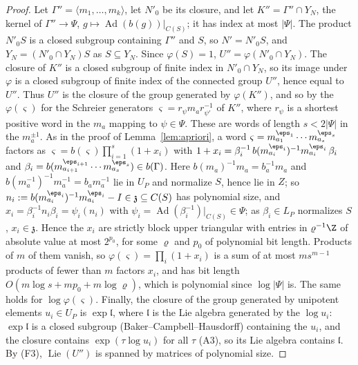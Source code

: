 \begin{proof}
Let $\Gamma''=\langle m_1,\ldots,m_k\rangle$, let $N'_0$ be its closure, and let $K''=\Gamma''\cap Y_N$, the kernel of
$\Gamma''\to\Psi$, $g\mapsto\operatorname{Ad}(b(g))|_{C(S)}$; it has index at most $|\Psi|$. The product $N'_0S$ is a closed
subgroup containing $\Gamma''$ and $S$, so $N'=N'_0S$, and $Y_N=(N'_0\cap Y_N)S$ as $S\subseteq Y_N$. Since
$\varphi(S)=1$, $U''=\varphi(N'_0\cap Y_N)$. The closure of $K''$ is a closed subgroup of finite index in
$N'_0\cap Y_N$, so its image under $\varphi$ is a closed subgroup of finite index of the connected group $U''$,
hence equal to $U''$. Thus $U''$ is the closure of the group generated by $\varphi(K'')$, and so by the
$\varphi(\varsigma)$ for the Schreier generators $\varsigma=r_\psi m_ar_{\psi'}^{-1}$ of $K''$, where $r_\psi$ is a
shortest positive word in the $m_a$ mapping to $\psi\in\Psi$. These are words of length $s<2|\Psi|$ in the
$m_a^{\pm1}$. As in the proof of Lemma~\ref{lem:apriori}, a word
$\varsigma=m_{a_1}^{\eps_1}\cdots m_{a_s}^{\eps_s}$ factors as $\varsigma=b(\varsigma)\prod_{i=1}^s(1+x_i)$ with
$1+x_i=\beta_i^{-1}\,b(m_{a_i}^{\eps_i})^{-1}m_{a_i}^{\eps_i}\,\beta_i$ and
$\beta_i=b(m_{a_{i+1}}^{\eps_{i+1}}\cdots m_{a_s}^{\eps_s})\in b(\Gamma)$. Here
$b(m_a)^{-1}m_a=b_a^{-1}m_a$ and $b(m_a^{-1})^{-1}m_a^{-1}=b_am_a^{-1}$ lie in $U_P$ and normalize $S$, hence lie
in $Z$; so $n_i:=b(m_{a_i}^{\eps_i})^{-1}m_{a_i}^{\eps_i}-I\in\mathfrak z\subseteq C(S)$ has polynomial size, and
$x_i=\beta_i^{-1}n_i\beta_i=\psi_i(n_i)$ with $\psi_i=\operatorname{Ad}(\beta_i^{-1})|_{C(S)}\in\Psi$; as
$\beta_i\in L_P$ normalizes $S$, $x_i\in\mathfrak z$. Hence the $x_i$ are strictly block upper triangular with
entries in $\varrho^{-1}\Z$ of absolute value at most $2^{p_0}$, for some $\varrho$ and $p_0$ of polynomial
bit length.
Products of $m$ of them vanish, so $\varphi(\varsigma)=\prod_i(1+x_i)$ is a sum of at most $ms^{m-1}$ products of
fewer than $m$ factors $x_i$, and has bit length $O(m\log s+mp_0+m\log\varrho)$, which is polynomial since
$\log|\Psi|$ is. The same holds for $\log\varphi(\varsigma)$. Finally, the closure of the group generated by
unipotent elements $u_i\in U_P$ is $\exp\mathfrak l$, where $\mathfrak l$ is the Lie algebra generated by the
$\log u_i$: $\exp\mathfrak l$ is a closed subgroup (Baker--Campbell--Hausdorff) containing the $u_i$, and the
closure contains $\exp(\tau\log u_i)$ for all $\tau$ (A3), so its Lie algebra contains $\mathfrak l$. By (F3),
$\operatorname{Lie}(U'')$ is spanned by matrices of polynomial size.
\end{proof}

